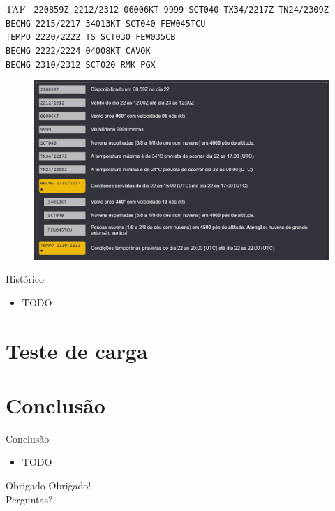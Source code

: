 \documentclass{beamer}
\begin{document}
\begin{frame}{TAF}
    \footnotesize{\texttt{
220859Z 2212/2312 06006KT 9999 SCT040 TX34/2217Z TN24/2309Z \\
    BECMG 2215/2217 34013KT SCT040 FEW045TCU \\
    TEMPO 2220/2222 TS SCT030 FEW035CB \\
    BECMG 2222/2224 04008KT CAVOK \\
    BECMG 2310/2312 SCT020 RMK PGX}}

  \begin{figure}[ht]
    \begin{center}
    \includegraphics[width=0.7\linewidth]{img/TAF-SBBE.png}
    \label{fig:UI}
    \end{center}
    \end{figure}
\end{frame}

\begin{frame}{Histórico}
    \begin{itemize}
        \item TODO
    \end{itemize}
\end{frame}

\section{Teste de carga}

\section{Conclusão}

\begin{frame}{Conclusão}
    \begin{itemize}
        \item TODO
    \end{itemize}
\end{frame}

\begin{frame}{Obrigado}
    \centering
    \Huge Obrigado! \\
    \normalsize Perguntas?
\end{frame}
\end{document}
